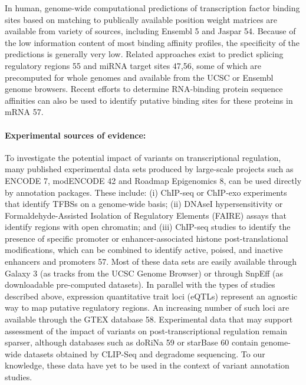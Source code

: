 In human, genome-wide computational predictions of transcription factor binding sites based on matching to publically available position weight matrices are available from variety of sources, including Ensembl 5 and Jaspar 54.  Because of the low information content of most binding affinity profiles, the specificity of the predictions is generally very low. Related approaches exist to predict splicing regulatory regions 55 and miRNA target sites 47,56, some of which are precomputed for whole genomes and available from the UCSC or Ensembl genome browsers. Recent efforts to determine RNA-binding protein sequence affinities can also be used to identify putative binding sites for these proteins in mRNA 57.

\paragraph{Experimental sources of evidence:} To investigate the potential impact of variants on transcriptional regulation, many published experimental data sets produced by large-scale projects such as ENCODE 7, modENCODE 42 and Roadmap Epigenomics 8, can be used directly by annotation packages. These include: (i) ChIP-seq or ChIP-exo experiments that identify TFBSs on a genome-wide basis; (ii) DNAseI hypersensitivity or Formaldehyde-Assisted Isolation of Regulatory Elements (FAIRE) assays that identify regions with open chromatin; and (iii) ChIP-seq studies to identify the presence of specific promoter or enhancer-associated histone post-translational modifications, which can be combined to identify active, poised, and inactive enhancers and promoters 57. Most of these data sets are easily available through Galaxy 3 (as tracks from the UCSC Genome Browser) or through SnpEff (as downloadable pre-computed datasets). In parallel with the types of studies described above, expression quantitative trait loci (eQTLs) represent an agnostic way to map putative regulatory regions. An increasing number of such loci are available through the GTEX database 58. Experimental data that may support assessment of the impact of variants on post-transcriptional regulation remain sparser, although databases such as doRiNa 59 or starBase 60 contain genome-wide datasets obtained by CLIP-Seq and degradome sequencing. To our knowledge, these data have yet to be used in the context of variant annotation studies.

